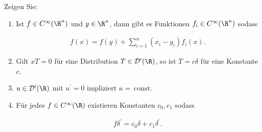 
\begin{exercise}

Zeigen Sie:

\begin{enumerate}[label = (\roman*)]

    \item Ist $f \in C^\infty(\R^n)$ und $y \in \R^n$, dann gibt es Funktionen $f_i \in C^\infty(\R^n)$ sodass

    \begin{align*}
        f(x) = f(y) + \sum_{i=1}^n (x_i - y_i) f_i(x).
    \end{align*}

    \item Gilt $xT = 0$ für eine Distribution $T \in \mathcal{D}^\prime(\R)$, so ist $T = c \delta$ für eine Konstante $c$.
    \item $u \in \mathcal{D}^\prime(\R)$ mit $u^\prime = 0$ impliziert $u = ~\text{const}$.
    \item Für jedes $f \in C^\infty(\R)$ existieren Konstanten $c_0, c_1$ sodass

    \begin{align*}
        f \delta^\prime
        =
        c_0 \delta
        +
        c_1 \delta^\prime.
    \end{align*}

\end{enumerate}

\end{exercise}


